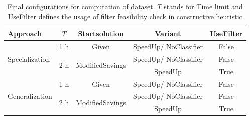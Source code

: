 \begin{table}[ht]
    \centering
    \small
    \begin{tabular}{l c c c c }
        \toprule
        Approach                        & $T$                  & Startsolution                    & Variant               & UseFilter \\
        \midrule
        \multirow{3}{*}{Specialization} & 1 h                  & Given                            & SpeedUp/ NoClassifier & False     \\\cmidrule(lr){2-5}
                                        & \multirow{2}{*}{2 h} & \multirow{2}{*}{ModifiedSavings} & SpeedUp/ NoClassifier & False     \\
                                        &                      &                                  & SpeedUp               & True      \\ \midrule
        \multirow{3}{*}{Generalization} & 1 h                  & Given                            & SpeedUp/ NoClassifier & False     \\\cmidrule(lr){2-5}
                                        & \multirow{2}{*}{2 h} & \multirow{2}{*}{ModifiedSavings} & SpeedUp/ NoClassifier & False     \\
                                        &                      &                                  & SpeedUp               & True      \\
        \bottomrule
    \end{tabular}
    \caption[Final configurations for computation of \krebsADataSetText dataset.]{Final configurations for computation of \krebsADataSetText dataset. $T$ stands for Time limit and UseFilter defines the usage of
        filter feasibility check in constructive heuristic}
\end{table}
